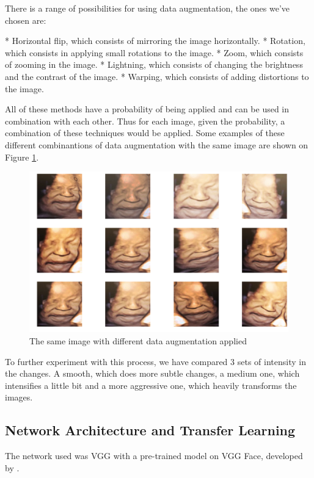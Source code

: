 There is a range of possibilities for using data augmentation, the ones we've chosen are:

* Horizontal flip, which consists of mirroring the image horizontally. 
* Rotation, which consists in applying small rotations to the image.
* Zoom, which consists of zooming in the image.
* Lightning, which consists of changing the brightness and the contrast of the image.
* Warping, which consists of adding distortions to the image. 

All of these methods have a probability of being applied and can be used in combination with each other. Thus for each image, given the probability, a combination of these techniques would be applied. Some examples of these different combinantions of data augmentation with the same image are shown on Figure \ref{fig:data_augmentation}.

\begin{figure}[h!tp]
    \centering
    \includegraphics[width=.9\textwidth]{imgs/chap3_data_augmentation.png}
    \caption{The same image with different data augmentation applied}
    \label{fig:data_augmentation}
\end{figure}

To further experiment with this process, we have compared 3 sets of intensity in the changes. A smooth, which does more subtle changes, a medium one, which intensifies a little bit and a more aggressive one, which heavily transforms the images.  
\subsection{Network Architecture and Transfer Learning}

The network used was VGG with a pre-trained model on VGG Face, developed by \cite{ParkhiVZ15}.




